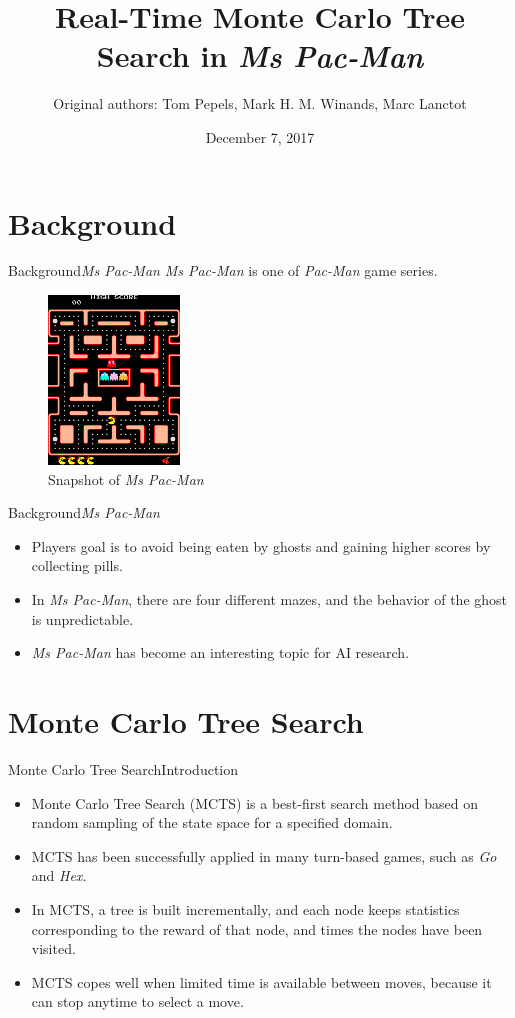 \documentclass{beamer}
\title[Real-Time Monte Carlo Tree Search in \textit{Ms Pac-Man}]{Real-Time Monte Carlo Tree Search in \textit{Ms Pac-Man}}
\institute{}
\author[Delivered by Chen Shaoyuan]{Original authors: Tom Pepels, Mark H. M. Winands, Marc Lanctot}
\date{December 7, 2017}
\begin{document}
  \begin{frame}
    \titlepage
  \end{frame}

  \section{Background}
  \begin{frame}{Background}{\textit{Ms Pac-Man}}
    \textit{Ms Pac-Man} is one of \textit{Pac-Man} game series.
    \begin{figure}
      \includegraphics[height = 4.5cm]{mspacman.png}
      \caption{Snapshot of \textit{Ms Pac-Man}}
    \end{figure}
  \end{frame}

  \begin{frame}{Background}{\textit{Ms Pac-Man}}
    \begin{itemize}
      \item Players goal is to avoid being eaten by ghosts and gaining higher scores by collecting pills.
      \item In \textit{Ms Pac-Man}, there are four different mazes, and the behavior of the ghost is unpredictable.
      \item \textit{Ms Pac-Man} has become an interesting topic for AI research.
    \end{itemize}
  \end{frame}

  \section{Monte Carlo Tree Search}
  \begin{frame}{Monte Carlo Tree Search}{Introduction}
  \begin{itemize}
    \item Monte Carlo Tree Search (MCTS) is a best-first search method based on random sampling of the state space for a specified domain.
    \item MCTS has been successfully applied in many turn-based games, such as \textit{Go} and \textit{Hex}.
    \item In MCTS, a tree is built incrementally, and each node keeps statistics corresponding to the reward of that node, and times the nodes have been visited.
    \item MCTS copes well when limited time is available between moves, because it can stop anytime to select a move.
  \end{itemize}
  \end{frame}
\end{document}
